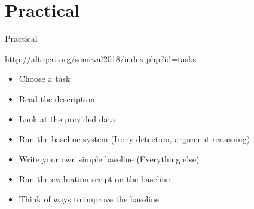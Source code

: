 \documentclass[10pt, compress]{beamer}
\begin{document}



\section{Practical}

\begin{frame}{Practical}

\begin{center}
\url{http://alt.qcri.org/semeval2018/index.php?id=tasks}
\end{center}

\begin{itemize}
  \item Choose a task
  \item Read the description
  \item Look at the provided data
\end{itemize}

\begin{itemize}
  \item Run the baseline system (Irony detection, argument reasoning)
  \item Write your own simple baseline (Everything else)
\end{itemize}

\begin{itemize}
  \item Run the evaluation script on the baseline
  \item Think of ways to improve the baseline
\end{itemize}

\end{frame}
\end{document}
